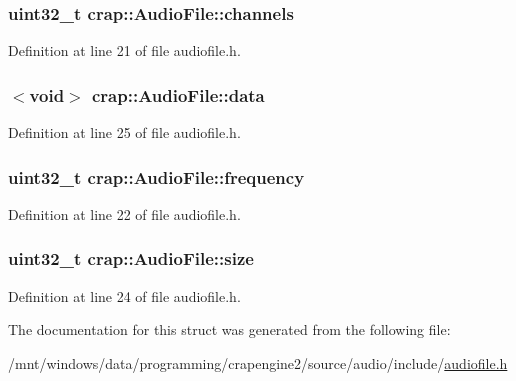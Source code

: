 \hypertarget{structcrap_1_1_audio_file_a78b93f01a2e9b481371ef7c64b7fabb4}{
\subsubsection[{channels}]{\setlength{\rightskip}{0pt plus 5cm}uint32\+\_\+t crap\+::\+Audio\+File\+::channels}}\label{structcrap_1_1_audio_file_a78b93f01a2e9b481371ef7c64b7fabb4}


Definition at line 21 of file audiofile.\+h.

\hypertarget{structcrap_1_1_audio_file_a0c75cc1dfed89dc59fb3868cdf2a8b2e}{
\subsubsection[{data}]{$<$void$>$ crap\+::\+Audio\+File\+::data}}\label{structcrap_1_1_audio_file_a0c75cc1dfed89dc59fb3868cdf2a8b2e}


Definition at line 25 of file audiofile.\+h.

\hypertarget{structcrap_1_1_audio_file_ae5c7beff491714d262eea53b7760f1a2}{
\subsubsection[{frequency}]{\setlength{\rightskip}{0pt plus 5cm}uint32\+\_\+t crap\+::\+Audio\+File\+::frequency}}\label{structcrap_1_1_audio_file_ae5c7beff491714d262eea53b7760f1a2}


Definition at line 22 of file audiofile.\+h.

\hypertarget{structcrap_1_1_audio_file_ad5c536e16fbd38393346b0bc2c7ba099}{
\subsubsection[{size}]{\setlength{\rightskip}{0pt plus 5cm}uint32\+\_\+t crap\+::\+Audio\+File\+::size}}\label{structcrap_1_1_audio_file_ad5c536e16fbd38393346b0bc2c7ba099}


Definition at line 24 of file audiofile.\+h.



The documentation for this struct was generated from the following file\+:\begin{DoxyCompactItemize}
\item 
/mnt/windows/data/programming/crapengine2/source/audio/include/\hyperlink{audiofile_8h}{audiofile.\+h}\end{DoxyCompactItemize}
